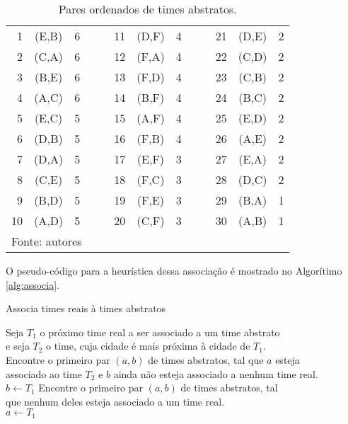 \documentclass[12pt,a4paper]{article}
\makeatletter
\newcommand{\algorithmfootnote}[2][\footnotesize]{%
	\let\old@algocf@finish\@algocf@finish%
	\def\@algocf@finish{\old@algocf@finish%
		\leavevmode\rlap{\begin{minipage}{\linewidth}
				#1#2
		\end{minipage}}%
	}%
}
\renewcommand*{\arraystretch}{1.2}
\makeatother
\begin{document}
\begin{table}[H]
	\renewcommand{\arraystretch}{1}
	\centering
	\caption{Pares ordenados de times abstratos.}
	\label{tab:abstratos}
	\begin{tabular}{rcc c|c rcc c|c rcc}
		\toprule
		 1 & (E,B) & 6 &&& 11 & (D,F) & 4 &&& 21 & (D,E) & 2 \\
		 2 & (C,A) & 6 &&& 12 & (F,A) & 4 &&& 22 & (C,D) & 2 \\
		 3 & (B,E) & 6 &&& 13 & (F,D) & 4 &&& 23 & (C,B) & 2 \\
		 4 & (A,C) & 6 &&& 14 & (B,F) & 4 &&& 24 & (B,C) & 2 \\
		 5 & (E,C) & 5 &&& 15 & (A,F) & 4 &&& 25 & (E,D) & 2 \\
		 6 & (D,B) & 5 &&& 16 & (F,B) & 4 &&& 26 & (A,E) & 2 \\
		 7 & (D,A) & 5 &&& 17 & (E,F) & 3 &&& 27 & (E,A) & 2 \\
		 8 & (C,E) & 5 &&& 18 & (F,C) & 3 &&& 28 & (D,C) & 2 \\
		 9 & (B,D) & 5 &&& 19 & (F,E) & 3 &&& 29 & (B,A) & 1 \\
		10 & (A,D) & 5 &&& 20 & (C,F) & 3 &&& 30 & (A,B) & 1 \\
		\bottomrule
		\multicolumn{13}{l}{\footnotesize Fonte: autores}
	\end{tabular}
\end{table}

O pseudo-código para a heurística dessa associação é mostrado no Algorítimo \ref{alg:associa}.

\vspace{0.5cm}
\begin{algorithm}[H]
	\caption{Associa times reais à times abstratos}
	\algorithmfootnote{Fonte: \citet*{marcio:jogos}}
	\label{alg:associa}
	 {
		Seja $T_{1}$ o próximo time real a ser associado a um time abstrato\\
		e seja $T_{2}$ o time, cuja cidade é mais próxima à cidade de $T_{1}$.\\
		 {
			Encontre o primeiro par $(a,b)$ de times abstratos, tal que $a$ esteja\\
			associado ao time $T_{2}$ e $b$ ainda não esteja associado a nenhum time real.\\
			$b \leftarrow T_{1}$ }
		{ Encontre o primeiro par $(a,b)$ de times abstratos, tal\\
			que nenhum deles esteja associado a um time real.\\
			$a \leftarrow T_{1}$ } }
\end{algorithm}
\vspace{0.5cm}
\end{document}
